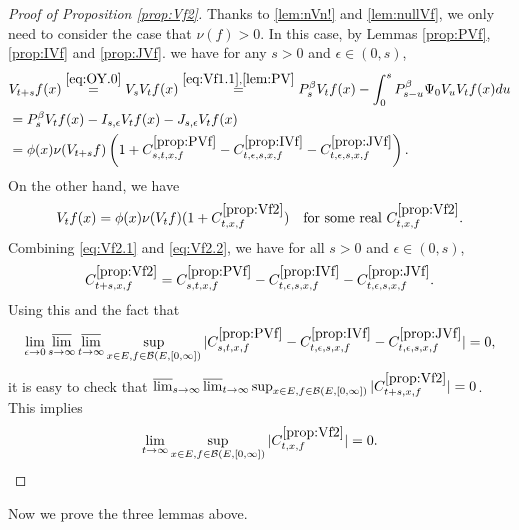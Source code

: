 \documentclass[12pt,a4paper]{amsart}
\numberwithin{equation}{section}
\theoremstyle{plain}
\theoremstyle{definition}
\theoremstyle{remark}
\begin{document}
\begin{proof}[{Proof of Proposition \ref{prop:Vf2}}]
Thanks to \eqref{lem:nVn!} and \eqref{lem:nullVf}, we only need to consider the case that $\nu(f)>0$.
	In this case,
by Lemmas \ref{prop:PVf}, \ref{prop:IVf} and \ref{prop:JVf}.
we have for any $s>0$ and $\epsilon\in (0,s)$,
\begin{align}
	& V_{t+s}f (x)
	\overset{\eqref{eq:OY.0}}= V_s V_t f(x)
	\overset{\eqref{eq:Vf1.1},\eqref{lem:PV}}= P_s^\beta V_t f(x) - \int_0^s P^\beta_{s-u}\Psi_0 V_uV_t f(x) du
	\\&= P_s^\beta V_t f(x) - I_{s,\epsilon} V_tf(x) - J_{s,\epsilon} V_t f(x)
	\\\label{eq:Vf2.1} &=\phi(x)\nu(V_{t+s}f) \left( 1+ C^{\ref{prop:PVf}}_{s,t,x,f} - C^{\ref{prop:IVf}}_{t,\epsilon, s, x,f}- C^{\ref{prop:JVf}}_{t,\epsilon,s,x,f}\right).
\end{align}
	On the other hand, we have
\begin{align}\label{eq:Vf2.2}
	V_{t}f (x)
	= \phi(x) \nu(V_{t}f) (1+ C^{\ref{prop:Vf2}}_{t,x,f})
	\quad \text{for some real $C^{\ref{prop:Vf2}}_{t,x,f}$}.
\end{align}
	Combining \eqref{eq:Vf2.1} and \eqref{eq:Vf2.2}, we have for all $s>0$ and $\epsilon \in (0,s)$,
\[
	C^{\ref{prop:Vf2}}_{t+s,x,f} = C^{\ref{prop:PVf}}_{s,t,x,f} - C^{\ref{prop:IVf}}_{t,\epsilon, s, x,f}- C^{\ref{prop:JVf}}_{t,\epsilon,s,x,f}.
\]
	 Using this and the fact that
\[
	\lim_{\epsilon \to 0}\varlimsup_{s\to \infty}\varlimsup_{t\to \infty}
	\sup_{x\in E, f\in \mathcal B(E,[0,\infty])}
	|C^{\ref{prop:PVf}}_{s,t,x,f} - C^{\ref{prop:IVf}}_{t,\epsilon, s, x,f}- C^{\ref{prop:JVf}}_{t,\epsilon,s,x,f}|=0,
\]
	it is easy to check that $\varlimsup_{s\to \infty}\varlimsup_{t\to \infty}
\sup_{x\in E, f\in \mathcal B(E,[0,\infty])}
	|C^{\ref{prop:Vf2}}_{t+s,x,f}|=0$.
	This implies
\[
	\lim_{t\to \infty}
\sup_{x\in E, f\in \mathcal B(E,[0,\infty])}
	|C^{\ref{prop:Vf2}}_{t,x,f}|=0.
	\qedhere
\]
\end{proof}

	Now we prove the three lemmas above.
\end{document}
